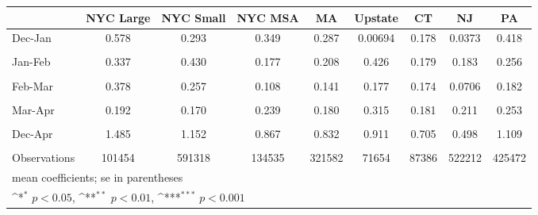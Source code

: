 {
\def\sym#1{\ifmmode^{#1}\else\(^{#1}\)\fi}
\begin{tabular}{l*{8}{c}}
\hline\hline
                    &\multicolumn{1}{c}{NYC Large}&\multicolumn{1}{c}{NYC Small}&\multicolumn{1}{c}{NYC MSA}&\multicolumn{1}{c}{MA}&\multicolumn{1}{c}{Upstate}&\multicolumn{1}{c}{CT}&\multicolumn{1}{c}{NJ}&\multicolumn{1}{c}{PA}\\
\hline
Dec-Jan             &       0.578         &       0.293         &       0.349         &       0.287         &     0.00694         &       0.178         &      0.0373         &       0.418         \\
                    &                     &                     &                     &                     &                     &                     &                     &                     \\
[1em]
Jan-Feb             &       0.337         &       0.430         &       0.177         &       0.208         &       0.426         &       0.179         &       0.183         &       0.256         \\
                    &                     &                     &                     &                     &                     &                     &                     &                     \\
[1em]
Feb-Mar             &       0.378         &       0.257         &       0.108         &       0.141         &       0.177         &       0.174         &      0.0706         &       0.182         \\
                    &                     &                     &                     &                     &                     &                     &                     &                     \\
[1em]
Mar-Apr             &       0.192         &       0.170         &       0.239         &       0.180         &       0.315         &       0.181         &       0.211         &       0.253         \\
                    &                     &                     &                     &                     &                     &                     &                     &                     \\
[1em]
Dec-Apr             &       1.485         &       1.152         &       0.867         &       0.832         &       0.911         &       0.705         &       0.498         &       1.109         \\
                    &                     &                     &                     &                     &                     &                     &                     &                     \\
\hline
Observations        &      101454         &      591318         &      134535         &      321582         &       71654         &       87386         &      522212         &      425472         \\
\hline\hline
\multicolumn{9}{l}{\footnotesize mean coefficients; se in parentheses}\\
\multicolumn{9}{l}{\footnotesize \sym{*} \(p<0.05\), \sym{**} \(p<0.01\), \sym{***} \(p<0.001\)}\\
\end{tabular}
}
